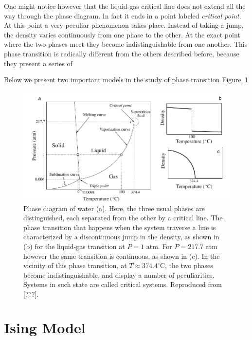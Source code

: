 One might notice however that the liquid-gas critical line does not extend all
the way through the phase diagram. In fact it ends in a point labeled
\textit{critical point}. At this point a very peculiar phenomenon takes place.
Instead of taking a jump, the density varies continuously from one phase to the
other. At the exact point where the two phases meet they become
indistinguishable from one another. This phase transition is radically different
from the others described before, because they present a series of

Below we present two important models in the study of phase transition
Figure~\ref{fig:water} 

\begin{figure}[h]
\begin{center}
    \includegraphics[scale=1.0]{chapters/ch2-crit/figs/water}
\end{center}
\caption{Phase diagram of water (a). Here, the three usual phases are
    distinguished, each separated from the other by a critical line. The phase
    transition that happens when the system traverse a line is characterized by
    a discontinuous jump in the density, as shown in (b) for the liquid-gas
    transition at $P=1$ atm. For $P=217.7$ atm however the same transition is
    continuous, as shown in (c). In the vicinity of this phase transition, at
    $T\approx374.4^\circ$C, the two phases become indistinguishable, and
    display a number of peculiarities. Systems in such state are called
    critical systems. Reproduced from [???].}
\label{fig:water}
\end{figure}


\section{Ising Model}
\label{sec:ising}

